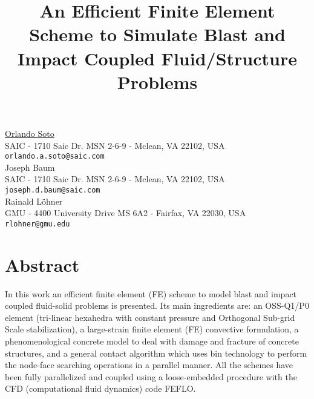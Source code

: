 

\title{An Efficient Finite Element Scheme to Simulate Blast and Impact Coupled
  Fluid/Structure Problems}
\author{} \institute{} %
\maketitle
\begin{center}
{\large \underline{Orlando Soto}}\\
SAIC - 1710 Saic Dr. MSN 2-6-9 - Mclean, VA 22102, USA\\
{\tt orlando.a.soto@saic.com}\\
\vspace{4mm} %
{\large Joseph Baum}\\
SAIC - 1710 Saic Dr. MSN 2-6-9 - Mclean, VA 22102, USA\\
{\tt joseph.d.baum@saic.com} \\
\vspace{4mm} %
{\large Rainald L\"ohner}\\
GMU - 4400 University Drive MS 6A2 - Fairfax, VA 22030, USA\\
{\tt rlohner@gmu.edu}
\end{center}

\section*{Abstract}

In this work an efficient finite element (FE) scheme to model blast and impact
coupled fluid-solid problems is presented. Its main ingredients are: an
OSS-Q1/P0 element (tri-linear hexahedra with
constant pressure and Orthogonal Sub-grid Scale stabilization), a 
large-strain finite  element (FE) convective formulation, a phenomenological
concrete model 
to  deal with damage and fracture of concrete structures, and a general
contact algorithm  which uses bin technology to perform the node-face
searching operations in a parallel manner. All the schemes have been fully
parallelized and coupled using a loose-embedded procedure with
the CFD (computational fluid dynamics) code FEFLO.

